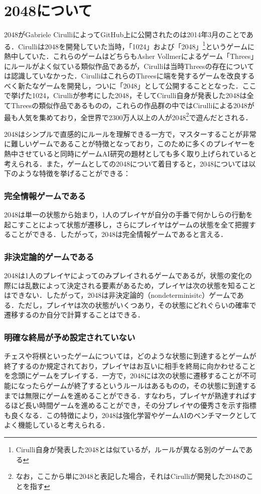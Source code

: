 \documentclass{suribt}
\begin{document}
\section{2048について}
2048がGabriele CirulliによってGitHub上に公開されたのは2014年3月のことである．\cite{BusinessInsider}Cirulliは2048を開発していた当時，「1024」および「2048」\footnote{Cirulli自身が発表した2048とは似ているが，ルールが異なる別のゲームである}というゲームに熱中していた．\cite{CirulliMedium}これらのゲームはどちらもAsher Vollmerによるゲーム「Threes」にルールがよく似ている類似作品であるが，Cirulliは当時Threesの存在については認識していなかった．CirulliはこれらのThreesに端を発するゲームを改良するべく新たなゲームを開発し，ついに「2048」として公開することとなった．ここで挙げた1024，Cirulliが参考にした2048，そしてCirulli自身が発表した2048は全てThreesの類似作品であるものの，これらの作品群の中ではCirulliによる2048が最も人気を集めており，全世界で2300万人以上の人が2048\footnote{なお，ここから単に2048と表記した場合，それはCirulliが開発した2048のことを指す}で遊んだとされる．\cite{CirulliMedium}

2048はシンプルで直感的にルールを理解できる一方で，マスターすることが非常に難しいゲームであることが特徴となっており，このために多くのプレイヤーを熱中させていると同時にゲームAI研究の題材としても多く取り上げられていると考えられる．また，ゲームとしての2048について着目すると，2048については以下のような特徴を挙げることができる：

\subsubsection{完全情報ゲームである}
2048は単一の状態から始まり，1人のプレイヤが自分の手番で何かしらの行動を起こすことによって状態が遷移し，さらにプレイヤはゲームの状態を全て把握することができる．したがって，2048は完全情報ゲームであると言える．

\subsubsection{非決定論的ゲームである}
2048は1人のプレイヤによってのみプレイされるゲームであるが，状態の変化の際には乱数によって決定される要素があるため，プレイヤは次の状態を知ることはできない．したがって，2048は非決定論的（nondeterminisitc）ゲームである．ただし，プレイヤは次の状態がいくつあり，その状態にどれぐらいの確率で遷移するのか自分で計算することはできる．

\subsubsection{明確な終局が予め設定されていない}
チェスや将棋といったゲームについては，どのような状態に到達するとゲームが終了するのか規定されており，プレイヤはお互いに相手を終局に向かわせることを念頭にゲームをプレイする．一方で，2048には次の状態に遷移することが不可能になったらゲームが終了するというルールはあるものの，その状態に到達するまでは無限にゲームを進めることができる．すなわち，プレイヤが熟達すればするほど長い時間ゲームを進めることができ，その分プレイヤの優秀さを示す指標も良くなる．この特徴により，2048は強化学習やゲームAIのベンチマークとしてよく機能していると考えられる．
\end{document}
